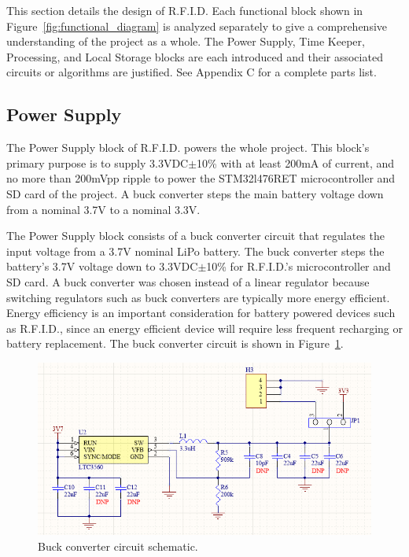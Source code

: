This section details the design of R.F.I.D. Each functional block shown in Figure~\ref{fig:functional_diagram} is analyzed separately to give a comprehensive understanding of the project as a whole. The Power Supply, Time Keeper, Processing, and Local Storage blocks are each introduced and their associated circuits or algorithms are justified. See Appendix C for a complete parts list.

\subsection{Power Supply}

The Power Supply block of R.F.I.D. powers the whole project. This block's primary purpose is to supply 3.3VDC$\pm$10\% with at least 200mA of current, and no more than 200mVpp ripple to power the STM32l476RET microcontroller and SD card of the project. A buck converter steps the main battery voltage down from a nominal 3.7V to a nominal 3.3V. 

The Power Supply block consists of a buck converter circuit that regulates the input voltage from a 3.7V nominal LiPo battery. The buck converter steps the battery's 3.7V voltage down to 3.3VDC$\pm$10\% for R.F.I.D.'s microcontroller and SD card. A buck converter was chosen instead of a linear regulator because switching regulators such as buck converters are typically more energy efficient. Energy efficiency is an important consideration for battery powered devices such as R.F.I.D., since an energy efficient device will require less frequent recharging or battery replacement. The buck converter circuit is shown in Figure~\ref{fig:buck_conv_schem}.

\begin{figure}[H]
    \centering
    \includegraphics[width=1\textwidth]{Figures/4_details/buck_schem.PNG} 
    \caption{Buck converter circuit schematic.}
    \label{fig:buck_conv_schem}
\end{figure}

